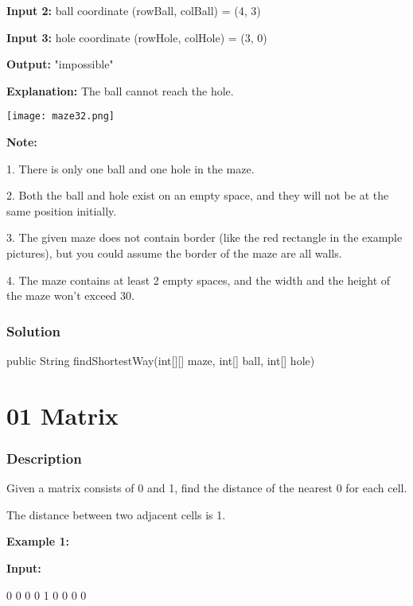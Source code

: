 \textbf{Input 2:} ball coordinate (rowBall, colBall) = (4, 3)

\textbf{Input 3:} hole coordinate (rowHole, colHole) = (3, 0)

\textbf{Output:} "impossible"

\textbf{Explanation:} The ball cannot reach the hole.

\begin{center}
\texttt{[image: maze32.png]}\\
\end{center}

\textbf{Note:}

1. There is only one ball and one hole in the maze.

2. Both the ball and hole exist on an empty space, and they will not be at the same position initially.

3. The given maze does not contain border (like the red rectangle in the example pictures), but you could assume the border of the maze are all walls.

4. The maze contains at least 2 empty spaces, and the width and the height of the maze won't exceed 30.

\subsubsection{Solution}

\begin{Code}
public String findShortestWay(int[][] maze, int[] ball, int[] hole) {

}
\end{Code}

\newpage

\section{01 Matrix} %

\subsubsection{Description}

Given a matrix consists of 0 and 1, find the distance of the nearest 0 for each cell.

The distance between two adjacent cells is 1.

\textbf{Example 1:}

\textbf{Input:}
\begin{Code}
0 0 0
0 1 0
0 0 0
\end{Code}

